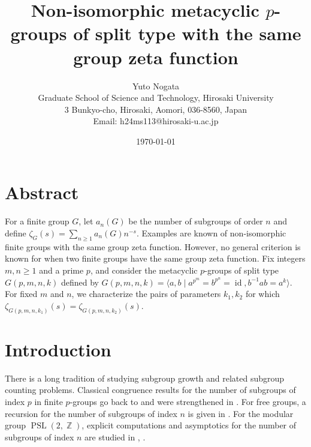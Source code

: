 \documentclass[onecolumn]{article}
\numberwithin{equation}{section}
\theoremstyle{mytheoremstyle}
\DeclareMathOperator{\PSL}{\mathrm{PSL}}
\DeclareMathOperator{\Z}{\mathbb{Z}}
\DeclareMathOperator{\id}{\mathrm{id}}
\begin{document}
\doublespacing

\title{Non-isomorphic metacyclic 
$p$-groups of split type with the same group zeta function}


\author{
Yuto Nogata\\
\normalsize{Graduate School of Science and Technology, Hirosaki University}\\
\normalsize{3 Bunkyo-cho, Hirosaki, Aomori, 036-8560, Japan}\\
\normalsize{Email: h24ms113@hirosaki-u.ac.jp}
}
\date{\today}

\maketitle



\section*{Abstract}
For a finite group $G$, let $a_n(G)$ be the number of subgroups of order $n$ and define
$\zeta_G(s)=\sum_{n\ge 1} a_n(G)n^{-s}$.
Examples are known of non-isomorphic finite groups with the same group zeta function.
However, no general criterion is known for when two finite groups have the same group zeta function.
Fix integers $m,n\ge 1$ and a prime $p$, and consider the metacyclic $p$-groups of split type $G(p,m,n,k)$ defined by $
G(p,m,n,k)=\langle a,b \mid a^{p^{m}}=b^{p^{n}}=\id, b^{-1}ab=a^{k}\rangle$.
For fixed $m$ and $n$, we characterize the pairs of parameters $k_1,k_2$ for which
$\zeta_{G(p,m,n,k_1)}(s)=\zeta_{G(p,m,n,k_2)}(s)$.








\section{Introduction}\label{section:meta-introduction-start}
There is a long tradition of studying subgroup growth and related subgroup counting problems.
Classical congruence results for the number of subgroups of index $p$ in finite $p$-groups go back to \cite{Miller1919} and were strengthened in \cite{Dyubyuk1950}.
For free groups, a recursion for the number of subgroups of index $n$ is given in \cite{Hall1949}.
For the modular group $\PSL(2,\Z)$, explicit computations and asymptotics for the number of subgroups of index $n$
are studied in \cite{Imrich1978}, \cite{Stothers1977}.
\end{document}

